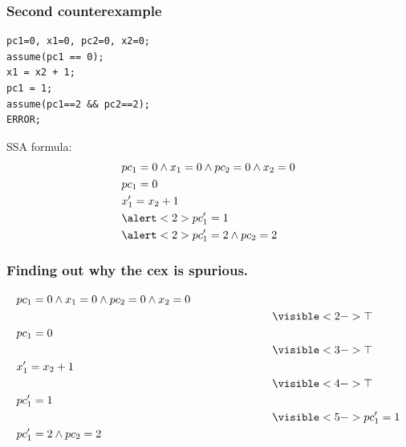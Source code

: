 \documentclass{beamer}
\begin{document}
\begin{frame}[fragile]
  \frametitle{Second counterexample}
\begin{minipage}{0.45\linewidth}
\begin{lstlisting}[numbers=none]
pc1=0, x1=0, pc2=0, x2=0;
assume(pc1 == 0);
x1 = x2 + 1;
pc1 = 1;
assume(pc1==2 && pc2==2);
ERROR;
\end{lstlisting}
\end{minipage}
\vfill
\begin{minipage}{0.8\linewidth}
SSA formula:
\begin{align*}
& pc_1=0 \land x_1=0 \land pc_2=0 \land x_2=0 \\
& pc_1=0 \\
& x_1' = x_2 + 1 \\
& \alert<2>{pc_1' = 1} \\
& \alert<2>{pc_1'=2} \land pc_2=2
\end{align*}
\end{minipage}
\end{frame}

\begin{frame}
  \frametitle{Finding out why the cex is spurious.}

\begin{align*}
& pc_1=0 \land x_1=0 \land pc_2=0 \land x_2=0 \\
& \hspace{8cm} \visible<2->{\top} \\
& pc_1=0 \\
& \hspace{8cm} \visible<3->{\top} \\
& x_1' = x_2 + 1 \\
& \hspace{8cm} \visible<4->{\top} \\
& pc_1' = 1 \\
& \hspace{8cm} \visible<5->{pc_1' = 1}\\
& pc_1'=2 \land pc_2=2
\end{align*}
\end{frame}
\end{document}
